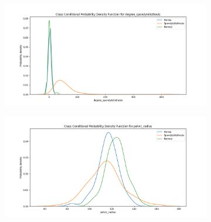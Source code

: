 \documentclass{article}
\begin{document}
\begin{figure}[H]
  \centering
  \begin{subfigure}{0.55\textwidth}
    \includegraphics[width=\linewidth]{images/prob_dens_highest_discriminative_feature.png}
  \end{subfigure}
  \begin{subfigure}{0.55\textwidth}
    \includegraphics[width=\linewidth]{images/prob_dens_lowest_discriminative_feature.png}
  \end{subfigure}
\end{figure}
\end{document}
